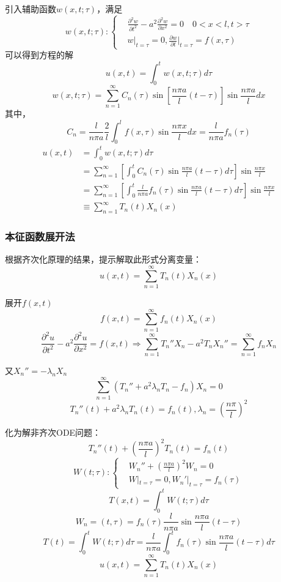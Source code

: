 引入辅助函数$w(x,t;\tau)$，满足
$$w(x,t;\tau):\left\{
\begin{aligned}
&
\frac{\partial^2{w}}{\partial{t}^2}-a^2\frac{\partial^2{w}}{\partial{x}^2}=0\quad 0<x<l,t>\tau\\
&w|_{t=\tau}=0,\frac{\partial{w}}{\partial t}\bigg|_{t=\tau}=f(x,\tau)
        \end{aligned}
\right.$$
可以得到方程的解
$$u(x,t)=\int_0^tw(x,t;\tau)d\tau$$
$$w(x,t;\tau)=\sum_{n=1}^{\infty}C_n(\tau)\sin{[\frac{n\pi a}{l}(t-\tau)]}\sin{\frac{n\pi a}{l}}dx$$
其中，
$$C_n=\frac{l}{n\pi a}\frac{2}{l}\int_{0}^{l}f(x,\tau)\sin{\frac{n\pi x}{l}}dx=\frac{l}{n\pi a}f_n(\tau)$$
$$\begin{aligned}
    u(x,t)&=\int_0^tw(x,t;\tau)d\tau\\
    &=\sum_{n=1}^\infty\left[\int^t_0C_n(\tau)\sin{\frac{n\pi a}{l}(t-\tau)}d\tau\right]\sin{\frac{n\pi x}{l}}\\
    &=\sum_{n=1}^\infty\left[\int^t_0\frac{l}{n\pi a}f_n(\tau)\sin{\frac{n\pi a}{l}(t-\tau)}d\tau\right]\sin{\frac{n\pi x}{l}}\\
    &\equiv\sum_{n=1}^\infty T_n(t)X_n(x)
    \end{aligned}$$

\subsubsection{本征函数展开法}
根据齐次化原理的结果，提示解取此形式分离变量：
$$u(x,t)=\sum_{n=1}^\infty T_n(t)X_n(x)$$

展开$f(x,t)$
$$f(x,t)=\sum_{n=1}^\infty f_n(t)X_n(x)$$
$$\frac{\partial^2{u}}{\partial{t}^2}-a^2\frac{\partial^2{u}}{\partial{x}^2}=f(x,t)\Rightarrow \sum_{n=1}^\infty T_n''X_n-a^2T_nX_n''=\sum_{n=1}^\infty f_nX_n$$

又$X_n''=-\lambda_nX_n$
$$\sum_{n=1}^\infty(T_n''+a^2\lambda_nT_n-f_n)X_n=0$$
$$T_n''(t)+a^2\lambda_nT_n(t)=f_n(t), \lambda_n=\left(\frac{n\pi}{l}\right)^2$$

化为解非齐次ODE问题：$$T_n''(t)+\left(\frac{n\pi a}{l}\right)^2T_n(t)=f_n(t)$$
$$W(t;\tau):\left\{
\begin{aligned}
&
W_n''+\left(\frac{n\pi a}{l}\right)^2W_n=0\\
&W|_{t=\tau}=0,W_n'|_{t=\tau}=f_n(\tau)
        \end{aligned}
\right.$$
$$T(x,t)=\int_0^tW(t;\tau)d\tau$$
$$W_n=(t,\tau)=f_n(\tau)\frac{l}{n\pi a}\sin\frac{n\pi a}{l}(t-\tau)$$
$$T(t)=\int_0^tW(t;\tau)d\tau=\frac{l}{n\pi a}\int_0^tf_n(\tau)\sin\frac{n\pi a}{l}(t-\tau)d\tau$$
$$u(x,t)=\sum_{n=1}^\infty T_n(t)X_n(x)$$

